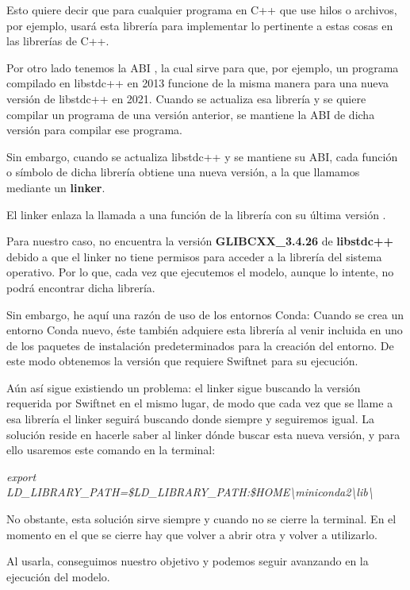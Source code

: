 Esto quiere decir que para cualquier programa en C++ que use hilos o archivos, por ejemplo, usará esta librería para implementar lo pertinente a estas cosas en las librerías de C++.

Por otro lado tenemos la \ac{ABI} \cite{glibcxx}, la cual sirve para que, por ejemplo, un programa compilado en libstdc++ en 2013 funcione de la misma manera para una nueva versión de libstdc++ en 2021. Cuando se actualiza esa librería y se quiere compilar un programa de una versión anterior, se mantiene la ABI de dicha versión para compilar ese programa.

Sin embargo, cuando se actualiza libstdc++ y se mantiene su ABI, cada función o símbolo de dicha librería obtiene una nueva versión, a la que llamamos mediante un \textbf{linker}.

El linker enlaza la llamada a una función de la librería con su última versión \cite{glibcxx}.

Para nuestro caso, no encuentra la versión \textbf{GLIBCXX\_3.4.26} de \textbf{libstdc++} debido a que el linker no tiene permisos para acceder a la librería del sistema operativo. Por lo que, cada vez que ejecutemos el modelo, aunque lo intente, no podrá encontrar dicha librería.

Sin embargo, he aquí una razón de uso de los entornos Conda: Cuando se crea un entorno Conda nuevo, éste también adquiere esta librería al venir incluida en uno de los paquetes de instalación predeterminados para la creación del entorno. De este modo obtenemos la versión que requiere Swiftnet para su ejecución.

Aún así sigue existiendo un problema: el linker sigue buscando la versión requerida por Swiftnet en el mismo lugar, de modo que cada vez que se llame a esa librería el linker seguirá buscando donde siempre y seguiremos igual. La solución reside en hacerle saber al linker dónde buscar esta nueva versión, y para ello usaremos este comando en la terminal:

\begin{center}
\textit{export LD\_LIBRARY\_PATH=\$LD\_LIBRARY\_PATH:\$HOME\textbackslash{miniconda2}\textbackslash{lib}\textbackslash{}}
\end{center}

No obstante, esta solución sirve siempre y cuando no se cierre la terminal. En el momento en el que se cierre hay que volver a abrir otra y volver a utilizarlo.

Al usarla, conseguimos nuestro objetivo y podemos seguir avanzando en la ejecución del modelo.

